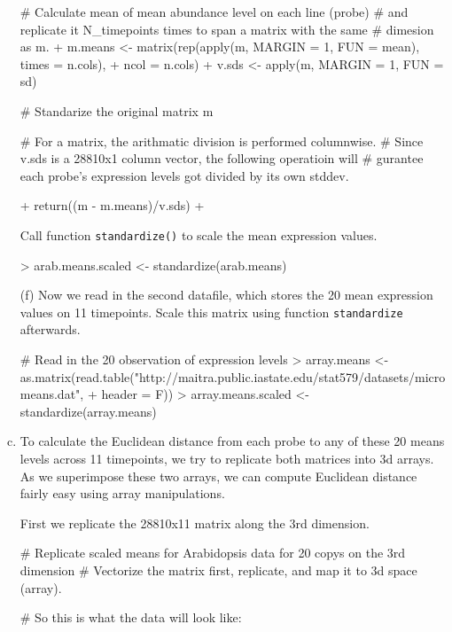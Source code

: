\documentclass{article}
\begin{document}
\begin{enumerate}[(a)]
\begin{Schunk}
\begin{Sinput}
{    # Calculate mean of mean abundance level on each line (probe)
    # and replicate it N_timepoints times to span a matrix with the same
    # dimesion as m.
+     m.means <- matrix(rep(apply(m, MARGIN = 1, FUN = mean), times = n.cols), 
+         ncol = n.cols)
+     v.sds <- apply(m, MARGIN = 1, FUN = sd)

    # Standarize the original matrix m

    # For a matrix, the arithmatic division is performed columnwise. 
    # Since v.sds is a 28810x1 column vector, the following operatioin will
    # gurantee each probe's expression levels got divided by its own stddev.

+     return((m - m.means)/v.sds)
+ }
\end{Sinput}
\end{Schunk}
    Call function \verb=standardize()= to scale the mean expression values.
\begin{Schunk}
\begin{Sinput}
> arab.means.scaled <- standardize(arab.means)
\end{Sinput}
\end{Schunk}
    \item[(f)] Now we read in the second datafile, which stores the 20 mean expression values on 11 timepoints. Scale this matrix using function \verb=standardize= afterwards.
\begin{Schunk}
\begin{Sinput}
# Read in the 20 observation of expression levels
> array.means <- as.matrix(read.table("http://maitra.public.iastate.edu/stat579/datasets/micromeans.dat", 
+     header = F))
> array.means.scaled <- standardize(array.means)
\end{Sinput}
\end{Schunk}
    \item To calculate the Euclidean distance from each probe to any of these 20 means levels across 11 timepoints, we try to replicate both matrices into 3d arrays. As we superimpose these two arrays, we can compute Euclidean distance fairly easy using array manipulations.

    First we replicate the 28810x11 matrix along the 3rd dimension.
\begin{Schunk}
\begin{Sinput}
# Replicate scaled means for Arabidopsis data for 20 copys on the 3rd dimension
# Vectorize the matrix first, replicate, and map it to 3d space (array).

# So this is what the data will look like:


\end{Sinput}
\end{Schunk}
\end{enumerate}
\end{document}
